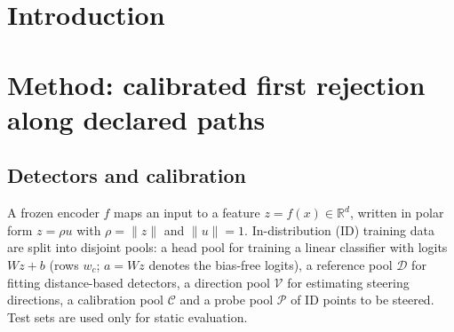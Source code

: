 \documentclass[11pt]{article}
\theoremstyle{definition}
\theoremstyle{remark}
\newcommand{\hole}[1]{\textcolor{red}{[#1]}}
\newcommand{\R}{\mathbb{R}}
\begin{document}
\section{Introduction}

\section{Method: calibrated first rejection along declared paths}\label{sec:method}

\subsection{Detectors and calibration}
A frozen encoder $f$ maps an input to a feature $z=f(x)\in\R^d$, written in polar form $z=\rho u$ with
$\rho=\|z\|$ and $\|u\|=1$. In-distribution (ID) training data are split into disjoint pools: a head pool
for training a linear classifier with logits $Wz+b$ (rows $w_c$; $a=Wz$ denotes the bias-free logits),
a reference pool $\mathcal{D}$ for fitting distance-based detectors, a direction pool $\mathcal{V}$ for
estimating steering directions, a calibration pool $\mathcal{C}$ and a probe pool $\mathcal{P}$ of ID
points to be steered. Test sets are used only for static evaluation.
\end{document}
